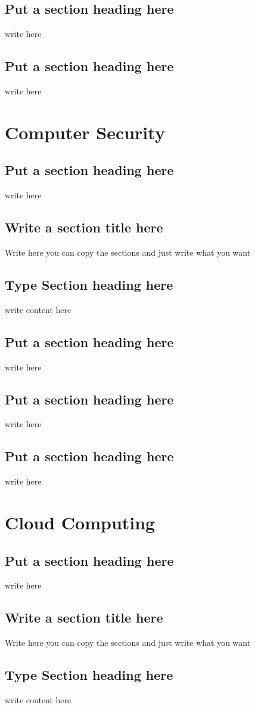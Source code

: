 \documentclass[a4paper,twoside]{scrbook}
\begin{document}
\section{Put a section heading here}
write here
\section{Put a section heading here}
write here
\chapter{Computer Security}\label{ch8}
\section{Put a section heading here}
write here
\section{Write a section title here}
Write here you can copy the sections and just write what you want
\section{Type Section heading here}
write content here
\section{Put a section heading here}
write here
\section{Put a section heading here}
write here
\section{Put a section heading here}
write here
\chapter{Cloud Computing}\label{ch9}
\section{Put a section heading here}
write here
\section{Write a section title here}
Write here you can copy the sections and just write what you want
\section{Type Section heading here}
write content here
\end{document}
